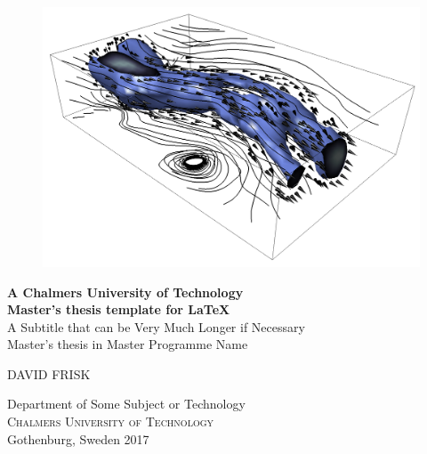 
\begin{titlepage}
			
\addtolength{\voffset}{2cm}

\begin{figure}[H]
\centering
\vspace{2cm}	%
\includegraphics[width=0.9\linewidth]{figure/Wind.png}
\end{figure}

\mbox{}
\vfill
\renewcommand{\familydefault}{\sfdefault} \normalfont %
\textbf{{\Huge 	A Chalmers University of Technology 	\\[0.2cm] 
				Master's thesis template for \LaTeX}} 	\\[0.5cm]
{\Large A Subtitle that can be Very Much Longer if Necessary}\\[0.5cm]
Master's thesis in Master Programme Name \setlength{\parskip}{1cm}

{\Large DAVID FRISK} \setlength{\parskip}{2.9cm}

Department of Some Subject or Technology \\
\textsc{Chalmers University of Technology} \\
Gothenburg, Sweden 2017

\renewcommand{\familydefault}{\rmdefault} \normalfont %
\end{titlepage}


